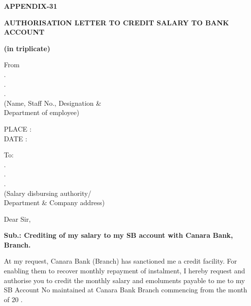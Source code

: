 \documentclass[11pt]{article}
\begin{document}
	
	\begin{center}
		\textbf{APPENDIX-31}
		
		\vspace{0.3cm}
		
		\textbf{AUTHORISATION LETTER TO CREDIT SALARY TO BANK ACCOUNT}
		
		\textbf{(in triplicate)}
	\end{center}
	
	\vspace{0.5cm}
	
	\noindent
	\begin{minipage}[t]{0.4\textwidth}
		From\\
		.\dotfill\\
		.\dotfill\\
		.\dotfill\\
		
		(Name, Staff No., Designation \&\\
		Department of employee)
	\end{minipage}
	\hfill
	\begin{minipage}[t]{0.3\textwidth}
		PLACE : \underline{\hspace{3cm}}\\[0.3cm]
		DATE : \underline{\hspace{3cm}}
	\end{minipage}
	
	\vspace{0.8cm}
	
	\noindent
	\begin{minipage}[t]{0.4\textwidth}
	To:\\
	.\dotfill\\
	.\dotfill\\
	.\dotfill\\
	
	(Salary disbursing authority/\\
	Department \& Company address)
	\end{minipage}
	\vspace{0.6cm}
	
	\noindent
	Dear Sir,
	
	\vspace{0.4cm}
	
	\noindent
	\textbf{Sub.: Crediting of my salary to my SB account with Canara Bank, \underline{\hspace{4cm}} Branch.}
	
	\vspace{0.5cm}
	
	\noindent
	At my request, Canara Bank \underline{\hspace{4cm}} (Branch) has sanctioned me a credit facility. For enabling them to recover monthly repayment of instalment, I hereby request and authorise you to credit the monthly salary and emoluments payable to me to my SB Account No \underline{\hspace{4cm}} maintained at Canara Bank \underline{\hspace{3cm}} Branch commencing from the month of 20 \underline{\hspace{1.5cm}}.
	
\end{document}
